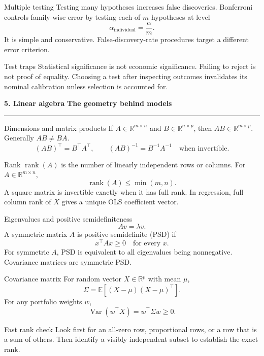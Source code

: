 \documentclass[10pt,a4paper]{article}
\newcommand{\sectionbanner}[2]{%
  \vspace{2mm}
  {\color{navy}\Large\bfseries #1}\hfill
  {\color{blue}\bfseries #2}
  \par\vspace{1mm}\color{line}\rule{\linewidth}{0.8pt}\color{ink}\vspace{2mm}
}
\newcommand{\E}{\mathbb{E}}
\newcommand{\Var}{\operatorname{Var}}
\newcommand{\R}{\mathbb{R}}
\begin{document}
\begin{formulabox}{Multiple testing}
Testing many hypotheses increases false discoveries. Bonferroni controls family-wise error by testing each of $m$ hypotheses at level
\[
\alpha_{\mathrm{individual}}=\frac{\alpha}{m}.
\]
It is simple and conservative. False-discovery-rate procedures target a different error criterion.
\end{formulabox}

\begin{trapbox}{Test traps}
Statistical significance is not economic significance. Failing to reject is not proof of equality. Choosing a test after inspecting outcomes invalidates its nominal calibration unless selection is accounted for.
\end{trapbox}

\sectionbanner{5. Linear algebra}{The geometry behind models}

\begin{formulabox}{Dimensions and matrix products}
If $A\in\R^{m\times n}$ and $B\in\R^{n\times p}$, then $AB\in\R^{m\times p}$. Generally $AB\neq BA$.
\[
(AB)^\top=B^\top A^\top,\qquad
(AB)^{-1}=B^{-1}A^{-1}\quad\text{when invertible}.
\]
\end{formulabox}

\begin{formulabox}{Rank}
$\operatorname{rank}(A)$ is the number of linearly independent rows or columns. For $A\in\R^{m\times n}$,
\[
\operatorname{rank}(A)\le\min(m,n).
\]
A square matrix is invertible exactly when it has full rank. In regression, full column rank of $X$ gives a unique OLS coefficient vector.
\end{formulabox}

\begin{formulabox}{Eigenvalues and positive semidefiniteness}
\[
Av=\lambda v.
\]
A symmetric matrix $A$ is positive semidefinite (PSD) if
\[
x^\top Ax\ge0\quad\text{for every }x.
\]
For symmetric $A$, PSD is equivalent to all eigenvalues being nonnegative. Covariance matrices are symmetric PSD.
\end{formulabox}

\begin{formulabox}{Covariance matrix}
For random vector $X\in\R^p$ with mean $\mu$,
\[
\Sigma=\E[(X-\mu)(X-\mu)^\top].
\]
For any portfolio weights $w$,
\[
\Var(w^\top X)=w^\top\Sigma w\ge0.
\]
\end{formulabox}

\begin{keybox}{Fast rank check}
Look first for an all-zero row, proportional rows, or a row that is a sum of others. Then identify a visibly independent subset to establish the exact rank.
\end{keybox}
\end{document}
